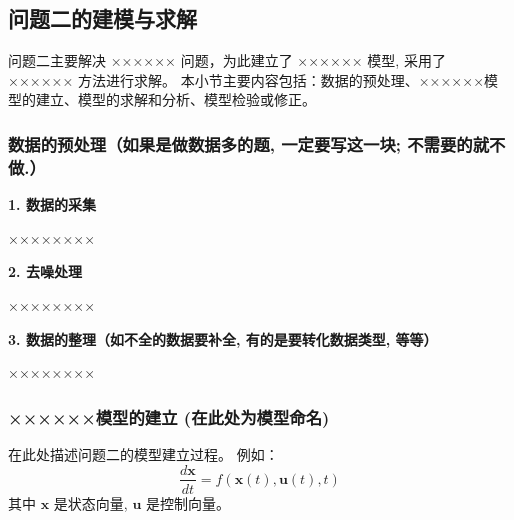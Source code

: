 \subsection{问题二的建模与求解}
问题二主要解决 ×××××× 问题，为此建立了 ×××××× 模型, 采用了 ×××××× 方法进行求解。
本小节主要内容包括：数据的预处理、××××××模型的建立、模型的求解和分析、模型检验或修正。

\subsubsection{数据的预处理（如果是做数据多的题, 一定要写这一块; 不需要的就不做.）}
    \textbf{1. 数据的采集}
    
    ××××××××
    
    \textbf{2. 去噪处理}
    
    ××××××××
    
    \textbf{3. 数据的整理（如不全的数据要补全, 有的是要转化数据类型, 等等）}
    
    ××××××××

\subsubsection{××××××模型的建立 (在此处为模型命名)}
    在此处描述问题二的模型建立过程。
    例如：
    \begin{equation}
        \frac{d\mathbf{x}}{dt} = f(\mathbf{x}(t), \mathbf{u}(t), t) \label{eq:q2_model}
    \end{equation}
    其中 $\mathbf{x}$ 是状态向量, $\mathbf{u}$ 是控制向量。

